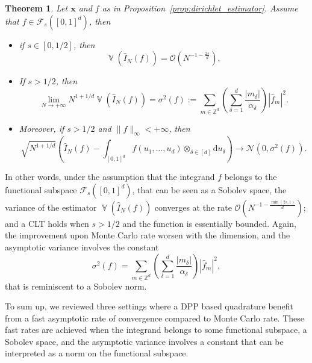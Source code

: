 \documentclass[twoside,11pt]{book}
\newtheorem{theorem}{Theorem}
\numberwithin{theorem}{chapter}
\numberwithin{definition}{chapter}
\numberwithin{proposition}{chapter}
\numberwithin{corollary}{chapter}
\numberwithin{example}{chapter}
\numberwithin{lemma}{chapter}
\DeclareMathOperator{\Var}{\mathbb{V}}
\begin{document}
\begin{theorem}
Let $\bm{x}$ and $f$ as in Proposition~\ref{prop:dirichlet_estimator}. Assume that $f \in \mathcal{F}_{s}([0,1]^{d})$, then
\begin{itemize}
\item if $s \in [0,1/2]$, then 
\begin{equation}
\Var (\hat{I}_{N}(f))  = \mathcal{O}(N^{-1-\frac{2s}{d}}),
\end{equation}
\item If $s>1/2$, then
\begin{equation}
\lim\limits_{N \rightarrow +\infty} N^{1+1/d} \Var (\hat{I}_{N}(f)) = \sigma^{2}(f) := \sum\limits_{m \in \mathbb{Z}^{d}}(\sum\limits_{\delta = 1}^{d} \frac{|m_{\delta}|}{\alpha_{\delta}} ) |\hat{f}_{m}|^{2}.
\end{equation}
\item Moreover, if $s>1/2$ and $ \|f\|_{\infty} < +\infty$, then
\begin{equation}
\sqrt{N^{1+1/d}} \left(\hat{I}_{N}(f) - \int_{[0,1]^{d}} f(u_{1}, \dots, u_{d}) \otimes_{\delta \in [d]} \mathrm{d}u_{\delta} \right) \rightarrow \mathcal{N}(0,\sigma^{2}(f)).
\end{equation}
\end{itemize}

\end{theorem}

In other words, under the assumption that the integrand $f$ belongs to the functional subspace $\mathcal{F}_{s}([0,1]^{d})$, that can be seen as a Sobolev space, the variance of the estimator $\Var (\hat{I}_{N}(f))$ converges at the rate $\mathcal{O}(N^{-1-\frac{\min(2s,1)}{d}})$; and a CLT holds when $s>1/2$ and the function is essentially bounded. Again, the improvement upon Monte Carlo rate worsen with the dimension, and the asymptotic variance involves the constant 
\begin{equation}
\sigma^{2}(f) = \sum\limits_{m \in \mathbb{Z}^{d}}(\sum\limits_{\delta = 1}^{d} \frac{|m_{\delta}|}{\alpha_{\delta}} ) |\hat{f}_{m}|^{2},
\end{equation}
that is reminiscent to a Sobolev norm.


To sum up, we reviewed three settings where a DPP based quadrature benefit from a fast asymptotic rate of convergence compared to  Monte Carlo rate. These fast rates are achieved when the integrand belongs to some functional subspace, a Sobolev space, and the asymptotic variance involves a constant that can be interpreted as a norm on the functional subspace.
\end{document}
